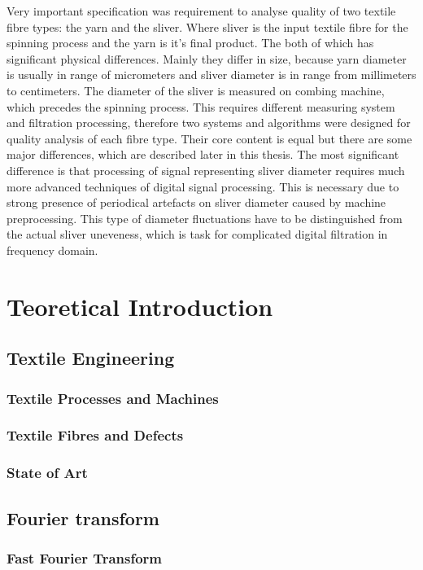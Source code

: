 \documentclass[twoside]{ctuthesis}
\theoremstyle{plain}
\theoremstyle{definition}
\theoremstyle{note}
\begin{document}
Very important specification was requirement to analyse quality of two textile fibre types: the  yarn and the sliver. Where sliver is the input textile fibre for the spinning process and the yarn is it's final product. The both of which has significant physical differences. Mainly they differ in size, because yarn diameter is usually in range of micrometers and sliver diameter is in range from millimeters to centimeters. The diameter of the sliver is measured on combing machine, which precedes the spinning process. This requires different measuring system and filtration processing, therefore two systems and algorithms were designed for quality analysis of each fibre type. Their core content is equal but there are some major differences, which are described later in this thesis. The most significant difference is that processing of signal representing sliver diameter requires much more advanced techniques of digital signal processing. This is necessary due to strong presence of periodical artefacts on sliver diameter caused by machine preprocessing. This type of diameter fluctuations have to be distinguished from the actual sliver uneveness, which is task for complicated digital filtration in frequency domain.

\chapter{Teoretical Introduction}

\section{Textile Engineering}
\subsection{Textile Processes and Machines}
\subsection{Textile Fibres and Defects}
\subsection{State of Art}
\section{Fourier transform}
\subsection{Fast Fourier Transform}
\end{document}
